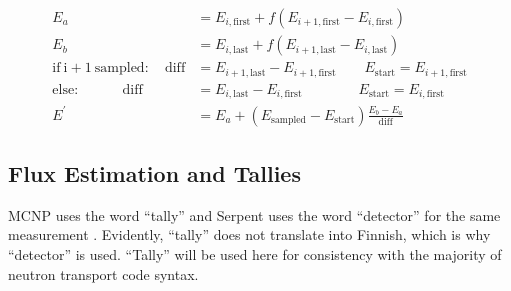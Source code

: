 \begin{equation}
\label{energy_scaling}
\begin{split}
E_a &= E_{i,\mathrm{first}} +  f( E_{i+1,\mathrm{first}} - E_{i,\mathrm{first}} ) \\
E_b &= E_{i,\mathrm{last}} +  f( E_{i+1,\mathrm{last}} - E_{i,\mathrm{last}} ) \\
\mathrm{if\:i+1\:sampled:} \quad \mathrm{diff} &= E_{i+1,\mathrm{last}}  - E_{i+1,\mathrm{first}}  \qquad E_\mathrm{start}= E_{i+1,\mathrm{first}}  \\
\mathrm{else:}          \qquad \quad       \mathrm{diff} &= E_{i,\mathrm{last}}  - E_{i,\mathrm{first}}  \qquad \qquad E_\mathrm{start}= E_{i,\mathrm{first}}  \\
E^\prime &=  E_a  +  ( E_\mathrm{sampled} - E_\mathrm{start})  \frac{ E_b - E_a}{ \mathrm{diff} }  
\end{split}
\end{equation}%


\subsection{Flux Estimation and Tallies}

MCNP uses the word ``tally'' and Serpent uses the word ``detector'' for the same measurement \cite{serpent,mcnp}.  Evidently, ``tally'' does not translate into Finnish, which is why ``detector'' is used.  ``Tally'' will be used here for consistency with the majority of neutron transport code syntax.  

